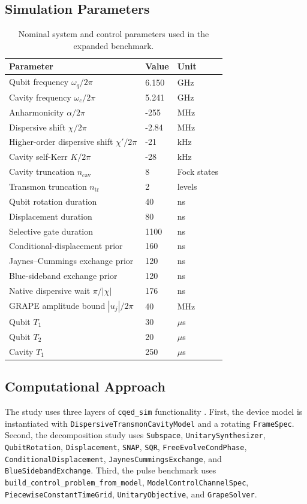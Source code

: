 \documentclass[11pt, a4paper]{article}
\begin{document}
\subsection{Simulation Parameters}
\begin{table}[H]
  \centering
  \caption{Nominal system and control parameters used in the expanded benchmark.}
  \begin{tabular}{@{} l l l @{}}
    \toprule
    Parameter & Value & Unit \\
    \midrule
    Qubit frequency \(\omega_q/2\pi\) & 6.150 & GHz \\
    Cavity frequency \(\omega_c/2\pi\) & 5.241 & GHz \\
    Anharmonicity \(\alpha/2\pi\) & -255 & MHz \\
    Dispersive shift \(\chi/2\pi\) & -2.84 & MHz \\
    Higher-order dispersive shift \(\chi'/2\pi\) & -21 & kHz \\
    Cavity self-Kerr \(K/2\pi\) & -28 & kHz \\
    Cavity truncation \(n_{\mathrm{cav}}\) & 8 & Fock states \\
    Transmon truncation \(n_{\mathrm{tr}}\) & 2 & levels \\
    Qubit rotation duration & 40 & ns \\
    Displacement duration & 80 & ns \\
    Selective gate duration & 1100 & ns \\
    Conditional-displacement prior & 160 & ns \\
    Jaynes--Cummings exchange prior & 120 & ns \\
    Blue-sideband exchange prior & 120 & ns \\
    Native dispersive wait \(\pi/|\chi|\) & 176 & ns \\
    GRAPE amplitude bound \(|u_j|/2\pi\) & 40 & MHz \\
    Qubit \(T_1\) & 30 & \(\mu\)s \\
    Qubit \(T_2\) & 20 & \(\mu\)s \\
    Cavity \(T_1\) & 250 & \(\mu\)s \\
    \bottomrule
  \end{tabular}
\end{table}

\subsection{Computational Approach}
The study uses three layers of \texttt{cqed\_sim} functionality \cite{cqedsim}.
First, the device model is instantiated with
\texttt{DispersiveTransmonCavityModel} and a rotating \texttt{FrameSpec}.
Second, the decomposition study uses
\texttt{Subspace}, \texttt{UnitarySynthesizer}, \texttt{QubitRotation},
\texttt{Displacement}, \texttt{SNAP}, \texttt{SQR},
\texttt{FreeEvolveCondPhase}, \texttt{ConditionalDisplacement},
\texttt{JaynesCummingsExchange}, and \texttt{BlueSidebandExchange}. Third, the
pulse benchmark uses \texttt{build\_control\_problem\_from\_model},
\texttt{ModelControlChannelSpec}, \texttt{PiecewiseConstantTimeGrid},
\texttt{UnitaryObjective}, and \texttt{GrapeSolver}.
\end{document}
